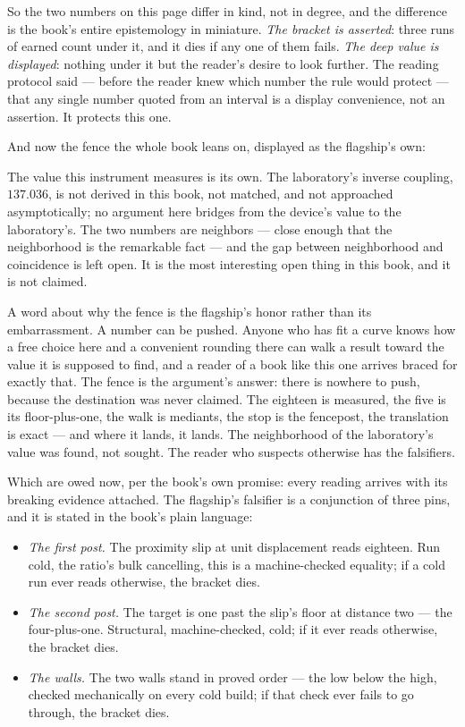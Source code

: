 So the two numbers on this page differ in kind, not in degree, and the difference
is the book's entire epistemology in miniature. \emph{The bracket is asserted}:
three runs of earned count under it, and it dies if any one of them fails.
\emph{The deep value is displayed}: nothing under it but the reader's desire to
look further. The reading protocol said --- before the reader knew which number the
rule would protect --- that any single number quoted from an interval is a display
convenience, not an assertion. It protects this one.

And now the fence the whole book leans on, displayed as the flagship's own:

\begin{fence}
The value this instrument measures is its own. The laboratory's inverse coupling,
$137.036$, is not derived in this book, not matched, and not approached
asymptotically; no argument here bridges from the device's value to the
laboratory's. The two numbers are neighbors --- close enough that the neighborhood
is the remarkable fact --- and the gap between neighborhood and coincidence is left
open. It is the most interesting open thing in this book, and it is not claimed.
\end{fence}

A word about why the fence is the flagship's honor rather than its embarrassment. A
number can be pushed. Anyone who has fit a curve knows how a free choice here and a
convenient rounding there can walk a result toward the value it is supposed to
find, and a reader of a book like this one arrives braced for exactly that. The
fence is the argument's answer: there is nowhere to push, because the destination
was never claimed. The eighteen is measured, the five is its floor-plus-one, the
walk is mediants, the stop is the fencepost, the translation is exact --- and where
it lands, it lands. The neighborhood of the laboratory's value was found, not
sought. The reader who suspects otherwise has the falsifiers.

Which are owed now, per the book's own promise: every reading arrives with its
breaking evidence attached. The flagship's falsifier is a conjunction of three
pins, and it is stated in the book's plain language:

\begin{itemize}
\item[--] \emph{The first post.} The proximity slip at unit displacement reads
eighteen. Run cold, the ratio's bulk cancelling, this is a machine-checked
equality; if a cold run ever reads otherwise, the bracket dies.
\item[--] \emph{The second post.} The target is one past the slip's floor at
distance two --- the four-plus-one. Structural, machine-checked, cold; if it ever
reads otherwise, the bracket dies.
\item[--] \emph{The walls.} The two walls stand in proved order --- the low below
the high, checked mechanically on every cold build; if that check ever fails to go
through, the bracket dies.
\end{itemize}

